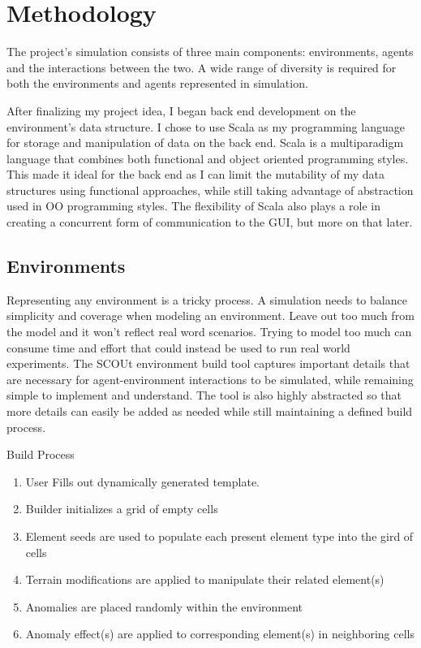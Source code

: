 

\chapter{Methodology}
The project’s simulation consists of three main components: environments, agents and the interactions between the two.
A wide range of diversity is required for both the environments and agents represented in simulation.

After finalizing my project idea, I began back end development on the environment’s data structure.
I chose to use Scala as my programming language for storage and manipulation of data on the back end.
Scala is a multiparadigm language that combines both functional and object oriented programming styles.
This made it ideal for the back end as I can limit the mutability of my data structures using functional approaches, while still taking advantage of abstraction used in OO programming styles.
The flexibility of Scala also plays a role in creating a concurrent form of communication to the GUI, but more on that later.


\section{Environments}
Representing any environment is a tricky process.
A simulation needs to balance simplicity and coverage when modeling an environment.
Leave out too much from the model and it won’t reflect real word scenarios.
Trying to model too much can consume time and effort that could instead be used to run real world experiments.
The SCOUt environment build tool captures important details that are necessary for agent-environment interactions to be simulated, while remaining simple to implement and understand.
The tool is also highly abstracted so that more details can easily be added as needed while still maintaining a defined build process.

Build Process
\begin{enumerate}
  \item User Fills out dynamically generated template. 
  \item	Builder initializes a grid of empty cells
  \item	Element seeds are used to populate each present element type into the gird of cells
  \item	Terrain modifications are applied to manipulate their related element(s)
  \item	Anomalies are placed randomly within the environment
  \item	Anomaly effect(s) are applied to corresponding element(s) in neighboring cells
\end{enumerate}

